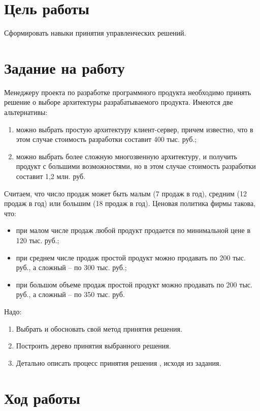 \documentclass[a4paper,14pt]{extarticle}
\begin{document}


\section{Цель работы}
Сформировать навыки принятия управленческих решений.

\section{Задание на работу}
Менеджеру проекта по разработке программного продукта необходимо принять решение
о выборе архитектуры разрабатываемого продукта. Имеются две альтернативы:
\begin{enumerate}
    \item можно выбрать простую архитектуру клиент-сервер, причем известно, что
          в этом случае стоимость разработки составит 400 тыс. руб.;
    \item можно выбрать более сложную многозвенную архитектуру, и получить
          продукт с большими возможностями, но в этом случае стоимость разработки
          составит 1,2 млн. руб.
\end{enumerate}

Считаем, что число продаж может быть малым (7 продаж в год), средним (12 продаж
в год) или большим (18 продаж в год). Ценовая политика фирмы такова, что:
\begin{itemize}
    \item при малом числе продаж любой продукт продается по минимальной цене в
          120 тыс. руб.;
    \item при  среднем числе продаж простой продукт можно продавать по 200 тыс.
          руб., а сложный – по 300 тыс. руб.;
    \item при большом объеме продаж простой продукт можно продавать по 200 тыс.
          руб., а сложный – по 350 тыс. руб.
\end{itemize}

Надо:
\begin{enumerate}
    \item Выбрать и обосновать свой метод принятия решения.
    \item Построить дерево принятия выбранного решения.
    \item Детально описать процесс принятия решения , исходя из задания.
\end{enumerate}
\pagebreak

\section{Ход работы}
\end{document}
